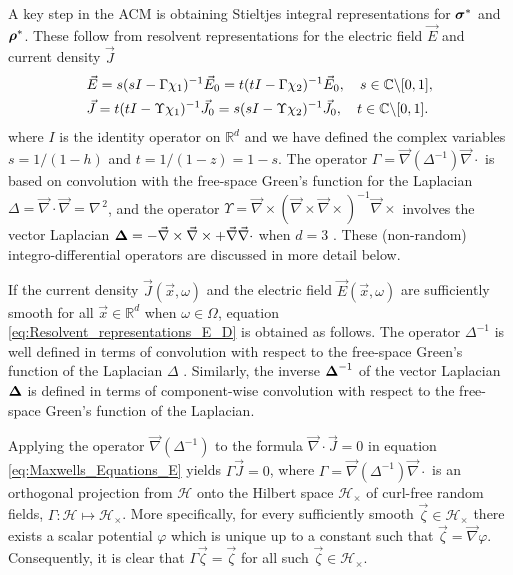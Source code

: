 \documentclass{cmslatex}
\newcommand\bsig{\mbox{\boldmath${\sigma}$}}
\newcommand\brho{\mbox{\boldmath${\rho}$}}
\newcommand\bDelta{\mbox{\boldmath${\Delta}$}}
\begin{document}
A key step in the ACM is
obtaining Stieltjes integral representations for $\bsig^*$ and
$\brho^*$. These follow from resolvent representations for the
electric field $\vec{E}$ \cite{Golden:CMP-473} and current density
$\vec{J}$ \cite{Murphy:JMP:063506}         
%
\begin{align}\label{eq:Resolvent_representations_E_D}
  &\vec{E}=s(sI-\Gamma\chi_1)^{-1}\vec{E}_0=t(tI-\Gamma\chi_2)^{-1}\vec{E}_0 ,
  \quad
   s\in\mathbb{C}\backslash[0,1],\\
  &\vec{J}=t(tI-\Upsilon\chi_1)^{-1}\vec{J}_0=s(sI-\Upsilon\chi_2)^{-1}\vec{J}_0 ,
  \quad
   t\in\mathbb{C}\backslash[0,1].\notag 
\end{align}
%
where $I$ is the identity operator on $\mathbb{R}^d$ and we have
defined the complex variables $s=1/(1-h)$ and $t=1/(1-z)=1-s$. 
The operator $\Gamma=\vec{\nabla}(\Delta^{-1})\vec{\nabla}\cdot$ is based on
convolution with the free-space Green's function for the Laplacian
$\Delta=\vec{\nabla}\cdot\vec{\nabla}=\nabla^{\,2}$, and the operator
$\Upsilon=\vec{\nabla}\times(\vec{\nabla}\times\vec{\nabla}\times)^{-1}\vec{\nabla}\times$ involves the vector
Laplacian $\bDelta=- \vec{\nabla}\times\vec{\nabla}\times + \vec{\nabla}\vec{\nabla}\cdot $ when $d=3$
\cite{Golden:CMP-473,Murphy:JMP:063506}. These (non-random)
integro-differential operators are discussed in more detail below.      



If the current density $\vec{J}(\vec{x},\omega)$ and the electric
field $\vec{E}(\vec{x},\omega)$ are sufficiently smooth for all
$\vec{x}\in\mathbb{R}^d$ when $\omega\in\Omega$, equation 
\eqref{eq:Resolvent_representations_E_D} is obtained as
follows. The operator $\Delta^{-1}$ is
well defined in terms of convolution with respect to the free-space
Green's function of the Laplacian $\Delta$
\cite{Golden:CMP-473,Folland:95}. Similarly, the inverse
$\bDelta^{-1}$ of the vector Laplacian $\bDelta$ is defined in terms
of component-wise convolution with respect to the free-space Green's
function of the Laplacian.

 

Applying the
operator $\vec{\nabla}(\Delta^{-1})$ to the
formula $\vec{\nabla}\cdot\vec{J}=0$ in equation
\eqref{eq:Maxwells_Equations_E} yields $\Gamma\vec{J}=0$, where
$\Gamma=\vec{\nabla}(\Delta^{-1})\vec{\nabla}\cdot$ is an orthogonal projection
\cite{Golden:CMP-473} from $\mathscr{H}$ onto the Hilbert space
$\mathscr{H}_\times$ of curl-free random fields,
$\Gamma:\mathscr{H}\mapsto\mathscr{H}_\times$. More specifically, for every
sufficiently smooth $\vec{\zeta}\in\mathscr{H}_\times$ there exists
\cite{Jackson-1999} a scalar potential $\varphi$ which is unique up to a 
constant such that $\vec{\zeta}=\vec{\nabla}\varphi$. Consequently, it is clear
that $\Gamma\vec{\zeta}=\vec{\zeta}$ for all such $\vec{\zeta}\in\mathscr{H}_\times$. 
\end{document}
